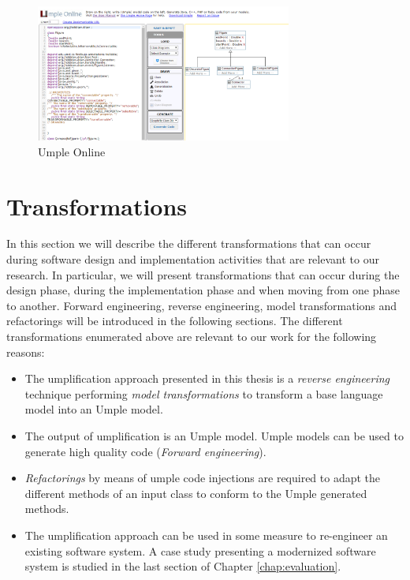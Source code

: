 \begin{figure}[h]
\centering
\includegraphics[width=0.75\textwidth]{Figures/uonline.png} 
\caption{Umple Online}
\label{fig:uonline}
\end{figure}


\section{Transformations}

In this section we will describe the different transformations that can occur during software design and implementation activities that are relevant to our research. In particular, we will present transformations that can occur during the design phase, during the implementation phase and when moving from one phase to another. Forward engineering, reverse engineering, model transformations and refactorings will be introduced in the following sections. The different transformations enumerated above are relevant to our work for the following reasons: 

\begin{itemize}
\item The umplification approach presented in this thesis is a \textit{reverse engineering} technique performing \textit{model transformations} to transform a base language model into an Umple model. 
\item The output of umplification is an Umple model. Umple models can be used to generate high quality code (\textit{Forward engineering}).
\item \textit{Refactorings} by means of umple code injections are required to adapt the different methods of an input class to conform to the Umple generated methods.
\item The umplification approach can be used in some measure to re-engineer an existing software system. A case study presenting a modernized software system is studied in the last section of Chapter \ref{chap:evaluation}.
\end{itemize}

